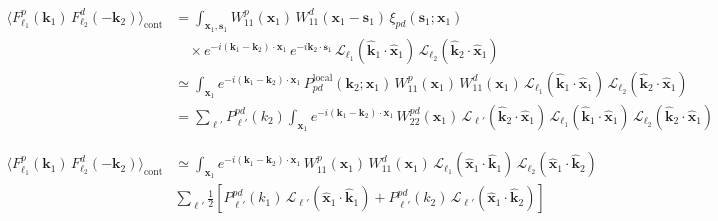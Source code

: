 \documentclass[a4paper,11pt]{article}
\begin{document}
\begin{align}
\langle
F_{\ell_1}^{p}(\boldsymbol{k}_1)\,
F_{\ell_2}^{d}(-\boldsymbol{k}_2)
\rangle_{\mathrm{cont}}
&=
\int_{\boldsymbol{x}_1, \boldsymbol{s}_1}
W_{11}^{p}(\boldsymbol{x}_1)\,
W_{11}^{d}(\boldsymbol{x}_1-\boldsymbol{s}_1)\,
\xi_{pd}(\boldsymbol{s}_1;\boldsymbol{x}_1)
\nonumber\\
&\quad\times
e^{-i(\boldsymbol{k}_1-\boldsymbol{k}_2)\cdot \boldsymbol{x}_1}\,
e^{-i\boldsymbol{k}_2\cdot \boldsymbol{s}_1}\,
\mathcal{L}_{\ell_1}\!(\hat{\boldsymbol{k}}_1\!\cdot\!\hat{\boldsymbol{x}}_1)\,
\mathcal{L}_{\ell_2}\!(\hat{\boldsymbol{k}}_2\!\cdot\!\hat{\boldsymbol{x}}_1)
\nonumber\\
&\simeq
\int_{\boldsymbol{x}_1}
e^{-i(\boldsymbol{k}_1-\boldsymbol{k}_2)\cdot \boldsymbol{x}_1}\,
P_{pd}^{\mathrm{local}}(\boldsymbol{k}_2;\boldsymbol{x}_1)\,
W_{11}^p(\boldsymbol{x}_1)\,
W_{11}^d(\boldsymbol{x}_1)\,
\mathcal{L}_{\ell_1}\!(\hat{\boldsymbol{k}}_1\!\cdot\!\hat{\boldsymbol{x}}_1)\,
\mathcal{L}_{\ell_2}\!(\hat{\boldsymbol{k}}_2\!\cdot\!\hat{\boldsymbol{x}}_1)
\nonumber\\
&=\sum_{\ell'}P^{pd}_{\ell'}(k_2)\int_{\boldsymbol{x}_1}
e^{-i(\boldsymbol{k}_1-\boldsymbol{k}_2)\cdot \boldsymbol{x}_1}\,
W_{22}^{pd}(\boldsymbol{x}_1)\,
\mathcal{L}_{\ell'}(\hat{\boldsymbol{k}}_2\!\cdot\!\hat{\boldsymbol{x}}_1)\,
\mathcal{L}_{\ell_1}\!(\hat{\boldsymbol{k}}_1\!\cdot\!\hat{\boldsymbol{x}}_1)\,
\mathcal{L}_{\ell_2}\!(\hat{\boldsymbol{k}}_2\!\cdot\!\hat{\boldsymbol{x}}_1)
\end{align}

\begin{align}
\langle
F_{\ell_1}^{p}(\boldsymbol{k}_1)\,
F_{\ell_2}^{d}(-\boldsymbol{k}_2)
\rangle_{\mathrm{cont}}
&\simeq
\int_{\boldsymbol{x}_1}
e^{-i(\boldsymbol{k}_1-\boldsymbol{k}_2)\cdot \boldsymbol{x}_1}\,
W_{11}^p(\boldsymbol{x}_1)\,
W_{11}^d(\boldsymbol{x}_1)\,
\mathcal{L}_{\ell_1}\!(\hat{\boldsymbol{x}}_1\!\cdot\!\hat{\boldsymbol{k}}_1)\,
\mathcal{L}_{\ell_2}\!(\hat{\boldsymbol{x}}_1\!\cdot\!\hat{\boldsymbol{k}}_2)\,
\nonumber\\
&\sum_{\ell'}
\frac{1}{2}
\left[
P^{pd}_{\ell'}(k_1)\,
\mathcal{L}_{\ell'}\!(\hat{\boldsymbol{x}}_1\!\cdot\!\hat{\boldsymbol{k}}_1)
+
P^{pd}_{\ell'}(k_2)\,
\mathcal{L}_{\ell'}\!(\hat{\boldsymbol{x}}_1\!\cdot\!\hat{\boldsymbol{k}}_2)
\right]
\end{align}
\end{document}
